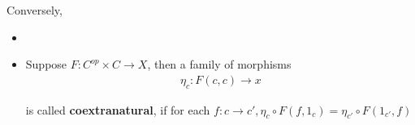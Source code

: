 \documentclass[Total.tex]{subfiles}
\begin{document}
\begin{Def}
\begin{itemize}
						\begin{center}
						\end{center}
					\end{itemize}
				\end{Def}
				
				Conversely,
				\begin{Def}
					\begin{itemize}
						\item 
						\item Suppose $F:C^{op}\times C\rightarrow X$, then a family of morphisms
						\begin{gather*}
							\eta_c:F(c,c)\rightarrow x
						\end{gather*}
						
						is called \textbf{coextranatural}, if for each $f:c\rightarrow c',\eta_c\circ F(f,1_c)=\eta_{c'}\circ F(1_{c'},f)$
						
						\begin{center}
						\end{center}
					\end{itemize}
				\end{Def}
\end{document}
